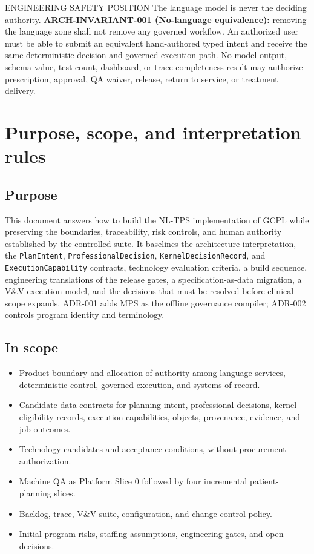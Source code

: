 \documentclass[11pt,letterpaper]{article}
\begin{document}
\begin{nlnotice}{ENGINEERING SAFETY POSITION}
The language model is never the deciding authority. \textbf{ARCH-INVARIANT-001 (No-language equivalence):} removing the language zone shall not remove any governed workflow. An authorized user must be able to submit an equivalent hand-authored typed intent and receive the same deterministic decision and governed execution path. No model output, schema value, test count, dashboard, or trace-completeness result may authorize prescription, approval, QA waiver, release, return to service, or treatment delivery.
\end{nlnotice}

\section{Purpose, scope, and interpretation rules}

\subsection{Purpose}

This document answers how to build the NL-TPS implementation of GCPL while preserving the boundaries, traceability, risk controls, and human authority established by the controlled suite. It baselines the architecture interpretation, the \texttt{PlanIntent}, \texttt{ProfessionalDecision}, \texttt{KernelDecisionRecord}, and \texttt{ExecutionCapability} contracts, technology evaluation criteria, a build sequence, engineering translations of the release gates, a specification-as-data migration, a V\&V execution model, and the decisions that must be resolved before clinical scope expands. ADR-001 adds MPS as the offline governance compiler; ADR-002 controls program identity and terminology.

\subsection{In scope}

\begin{itemize}
\item Product boundary and allocation of authority among language services, deterministic control, governed execution, and systems of record.
\item Candidate data contracts for planning intent, professional decisions, kernel eligibility records, execution capabilities, objects, provenance, evidence, and job outcomes.
\item Technology candidates and acceptance conditions, without procurement authorization.
\item Machine QA as Platform Slice 0 followed by four incremental patient-planning slices.
\item Backlog, trace, V\&V-suite, configuration, and change-control policy.
\item Initial program risks, staffing assumptions, engineering gates, and open decisions.
\end{itemize}
\end{document}
